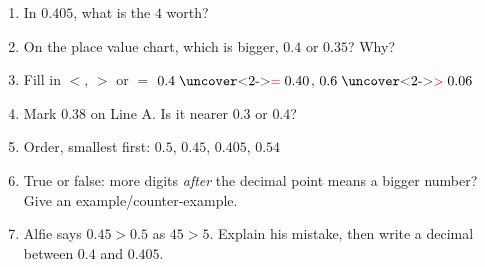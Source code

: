 \documentclass{beamer}
\newcommand{\ashow}[1]{\uncover<2->{\textcolor{red}{\small #1}}}
\begin{document}
\begin{frame}
\begin{columns}[T]
\begin{multicols}{2}
\begin{enumerate}
  \item In $0.405$, what is the $4$ worth? \ashow{$4$ tenths, $0.4$}

  \item On the place value chart, which is bigger, $0.4$ or $0.35$? Why? \ashow{$0.4$: $4$ tenths is greater than $3$ tenths}

  \item Fill in $<$, $>$ or $=$ $0.4 \mathrel{\text{\ashow{$=$}}} 0.40$, $0.6 \mathrel{\text{\ashow{$>$}}} 0.06$

\vspace{0.5em}

  \item Mark $0.38$ on Line A. Is it nearer $0.3$ or $0.4$? \ashow{nearer $0.4$}

  \columnbreak

  \item Order, smallest first: $0.5$, $0.45$, $0.405$, $0.54$ \ashow{$0.405$, $0.45$, $0.5$, $0.54$}

  \vspace{0.2em}

  \item True or false: more digits \emph{after} the decimal point means a bigger number? Give an example/counter-example. \ashow{False: $0.9>0.1234$}

  \vspace{0.2em}

  \item Alfie says $0.45>0.5$ as $45>5$. Explain his mistake, then write a decimal between $0.4$ and $0.405$. \ashow{$0.5$ has $5$ tenths; e.g.\ $0.402$}

\end{enumerate}
\end{multicols}

\end{columns}

\end{frame}
\end{document}
